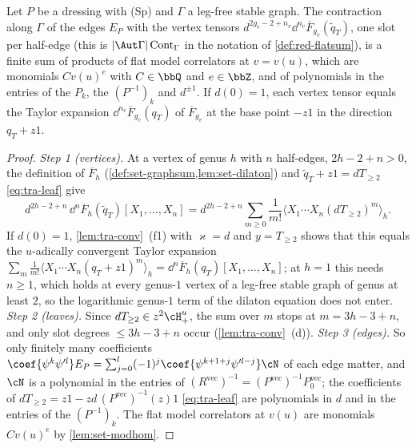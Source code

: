 \begin{lem}
\label{lem:tra-F}
Let $P$ be a dressing with (Sp) and $\Gamma$ a leg-free stable graph. The contraction along $\Gamma$ of the edges $E_P$ with the vertex tensors $d^{2g_v-2+n_v}\dd^{n_v}\overline F_{g_v}(\tilde q_T)$, one slot per half-edge (this is $|\Aut\Gamma|\,\mathrm{Cont}_\Gamma$ in the notation of \cref{def:red-flatsum}), is a finite sum of products of flat model correlators at $v = v(u)$, which are monomials $Cv(u)^e$ with $C\in\bbQ$ and $e\in\bbZ$, and of polynomials in the entries of the $P_k$, the $(P^{-1})_k$ and $d^{\pm 1}$. If $d(0) = 1$, each vertex tensor equals the Taylor expansion $\dd^{n_v}\overline F_{g_v}(q_T)$ of $\overline F_{g_v}$ at the base point $-z1$ in the direction $q_T+z1$.
\end{lem}

\begin{proof}
\emph{Step 1 (vertices).} At a vertex of genus $h$ with $n$ half-edges, $2h-2+n>0$, the definition of $\overline F_h$ (\cref{def:set-graphsum,lem:set-dilaton}) and $\tilde q_T+z1 = dT_{\geq 2}$ \eqref{eq:tra-leaf} give
\[
d^{2h-2+n}\,\dd^n\overline F_h(\tilde q_T)[X_1,\dots,X_n] = d^{2h-2+n}\sum_{m\geq 0}\frac1{m!}\langle X_1\cdots X_n(dT_{\geq 2})^m\rangle_h .
\]
If $d(0) = 1$, \cref{lem:tra-conv}~(f1) with $\varkappa = d$ and $y = T_{\geq 2}$ shows that this equals the $u$-adically convergent Taylor expansion $\sum_m\frac1{m!}\langle X_1\cdots X_n(q_T+z1)^m\rangle_h = \dd^n\overline F_h(q_T)[X_1,\dots,X_n]$; at $h = 1$ this needs $n\geq 1$, which holds at every genus-$1$ vertex of a leg-free stable graph of genus at least $2$, so the logarithmic genus-$1$ term of the dilaton equation does not enter. \emph{Step 2 (leaves).} Since $dT_{\geq 2}\in z^2\cH^u_+$, the sum over $m$ stops at $m = 3h-3+n$, and only slot degrees $\leq 3h-3+n$ occur (\cref{lem:tra-conv}~(d)). \emph{Step 3 (edges).} So only finitely many coefficients $\coef{\psi^k\psi'^l}E_P = \sum_{j=0}^l(-1)^j\coef{\psi^{k+1+j}\psi'^{l-j}}\cN$ of each edge matter, and $\cN$ is a polynomial in the entries of $(R^{\mathrm{vec}})^{-1} = (P^{\mathrm{vec}})^{-1}P_0^{\mathrm{vec}}$; the coefficients of $dT_{\geq 2} = z1-zd\,(P^{\mathrm{vec}})^{-1}(z)1$ \eqref{eq:tra-leaf} are polynomials in $d$ and in the entries of the $(P^{-1})_k$. The flat model correlators at $v(u)$ are monomials $Cv(u)^e$ by \cref{lem:set-modhom}.
\end{proof}

